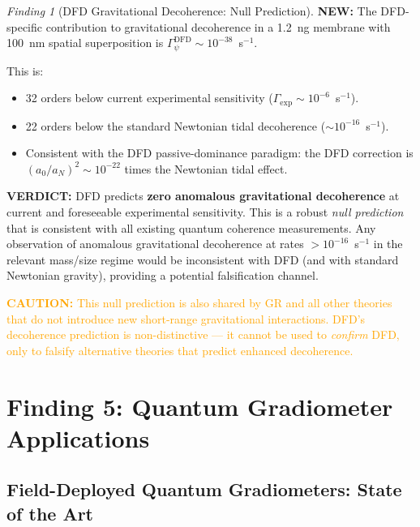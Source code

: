 \documentclass[11pt]{article}
\theoremstyle{definition}
\theoremstyle{remark}
\newtheorem{finding}[theorem]{Finding}
\newcommand{\azero}{a_0}
\newcommand{\caution}[1]{\textcolor{orange}{\textbf{CAUTION:} #1}}
\newcommand{\newresult}[1]{\textcolor{green!50!black}{\textbf{NEW:} #1}}
\newcommand{\verdict}[1]{\textcolor{green!50!black}{\textbf{VERDICT:} #1}}
\begin{document}
\begin{finding}[DFD Gravitational Decoherence: Null Prediction]
\label{find:decoherence}
\newresult{The DFD-specific contribution to gravitational decoherence
in a 1.2~ng membrane with 100~nm spatial superposition is
$\Gamma_\psi^{\mathrm{DFD}} \sim 10^{-38}$~s$^{-1}$.}

This is:
\begin{itemize}[nosep]
\item 32 orders below current experimental sensitivity
  ($\Gamma_{\mathrm{exp}} \sim 10^{-6}$~s$^{-1}$).
\item 22 orders below the standard Newtonian tidal decoherence
  ($\sim 10^{-16}$~s$^{-1}$).
\item Consistent with the DFD passive-dominance paradigm: the
  DFD correction is $(\azero/a_N)^2 \sim 10^{-22}$ times the
  Newtonian tidal effect.
\end{itemize}

\verdict{DFD predicts \textbf{zero anomalous gravitational decoherence}
at current and foreseeable experimental sensitivity. This is a robust
\emph{null prediction} that is consistent with all existing quantum
coherence measurements. Any observation of anomalous gravitational
decoherence at rates $> 10^{-16}$~s$^{-1}$ in the relevant mass/size
regime would be inconsistent with DFD (and with standard Newtonian
gravity), providing a potential falsification channel.}

\caution{This null prediction is also shared by GR and all other
theories that do not introduce new short-range gravitational
interactions. DFD's decoherence prediction is non-distinctive ---
it cannot be used to \emph{confirm} DFD, only to falsify alternative
theories that predict enhanced decoherence.}
\end{finding}

\section{Finding 5: Quantum Gradiometer Applications}
\label{sec:applications}

\subsection{Field-Deployed Quantum Gradiometers: State of the Art}
\end{document}
